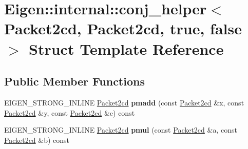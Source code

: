 \hypertarget{struct_eigen_1_1internal_1_1conj__helper_3_01_packet2cd_00_01_packet2cd_00_01true_00_01false_01_4}{}\section{Eigen\+:\+:internal\+:\+:conj\+\_\+helper$<$ Packet2cd, Packet2cd, true, false $>$ Struct Template Reference}
\label{struct_eigen_1_1internal_1_1conj__helper_3_01_packet2cd_00_01_packet2cd_00_01true_00_01false_01_4}
\subsection*{Public Member Functions}
\begin{DoxyCompactItemize}
\item 
\mbox{\label{struct_eigen_1_1internal_1_1conj__helper_3_01_packet2cd_00_01_packet2cd_00_01true_00_01false_01_4_a166a5efc61cfff2f3635af5fbf37db0e}} 
E\+I\+G\+E\+N\+\_\+\+S\+T\+R\+O\+N\+G\+\_\+\+I\+N\+L\+I\+NE \hyperlink{struct_eigen_1_1internal_1_1_packet2cd}{Packet2cd} {\bfseries pmadd} (const \hyperlink{struct_eigen_1_1internal_1_1_packet2cd}{Packet2cd} \&x, const \hyperlink{struct_eigen_1_1internal_1_1_packet2cd}{Packet2cd} \&y, const \hyperlink{struct_eigen_1_1internal_1_1_packet2cd}{Packet2cd} \&c) const
\item 
\mbox{\label{struct_eigen_1_1internal_1_1conj__helper_3_01_packet2cd_00_01_packet2cd_00_01true_00_01false_01_4_ae350a7a68057b0ecabe9cbb3cba29737}} 
E\+I\+G\+E\+N\+\_\+\+S\+T\+R\+O\+N\+G\+\_\+\+I\+N\+L\+I\+NE \hyperlink{struct_eigen_1_1internal_1_1_packet2cd}{Packet2cd} {\bfseries pmul} (const \hyperlink{struct_eigen_1_1internal_1_1_packet2cd}{Packet2cd} \&a, const \hyperlink{struct_eigen_1_1internal_1_1_packet2cd}{Packet2cd} \&b) const
\item 
\mbox{\label{struct_eigen_1_1internal_1_1conj__helper_3_01_packet2cd_00_01_packet2cd_00_01true_00_01false_01_4_a166a5efc61cfff2f3635af5fbf37db0e}} 

\end{DoxyCompactItemize}
